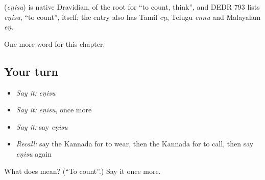 \begin{cousinweb}
\textbf{} (\emph{eṇisu}) is native Dravidian, of the root for \textquotedblleft{}to count, think\textquotedblright{}, and DEDR 793 lists \emph{eṇisu}, \textquotedblleft{}to count\textquotedblright{}, itself; the entry also has Tamil \emph{eṇ}, Telugu \emph{ennu} and Malayalam \emph{eṇ}.
\end{cousinweb}

\begin{grammarlens}[title={What you've built}]
One more word for this chapter.
\end{grammarlens}

\subsection*{Your turn}
\begin{itemize}
\raggedright
  \item \emph{Say it:} \emph{eṇisu}
  \item \emph{Say it:} \emph{eṇisu}, once more
  \item \emph{Say it:} say \emph{eṇisu}
  \item \emph{Recall:} say the Kannada for to wear, then the Kannada for to call, then say \emph{eṇisu} again
\end{itemize}

\begin{tcolorbox}[breakable,colback=teal!4,colframe=teal!35!black,title={Before you move on}]
What does  mean? (\textquotedblleft{}To count\textquotedblright{}.) Say it once more.
\end{tcolorbox}
